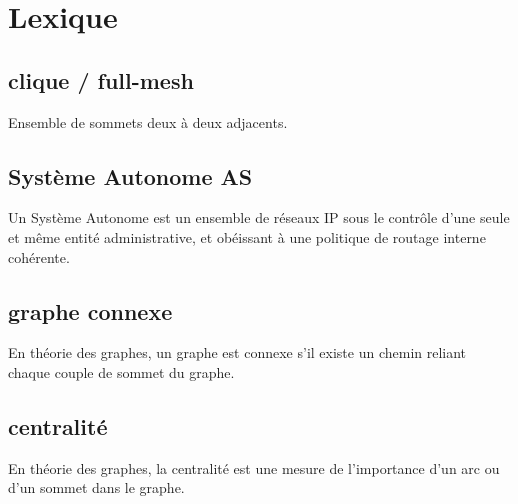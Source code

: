 
% 

\section*{Lexique}

\subsection*{clique / full-mesh}

Ensemble de sommets deux \`a deux adjacents.

\subsection*{Syst\`eme Autonome AS}

Un Syst\`eme Autonome est un ensemble de r\'eseaux IP sous le contrôle d'une seule et m\^eme entit\'e administrative, et ob\'eissant \`a une politique de routage interne coh\'erente.

\subsection*{graphe connexe}

En th\'eorie des graphes, un graphe est connexe s'il existe un chemin reliant chaque couple de sommet du graphe.

\subsection*{centralit\'e}

En th\'eorie des graphes, la centralit\'e est une mesure de l'importance d'un arc ou d'un sommet dans le graphe.

% 
